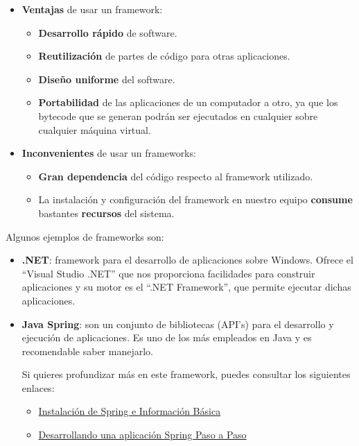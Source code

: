 \begin{itemize}
    \item \textbf{Ventajas} de usar un framework:
    \begin{itemize}
        \item \textbf{Desarrollo rápido} de software.
        \item \textbf{Reutilización} de partes de código para otras aplicaciones.
        \item \textbf{Diseño uniforme} del software.
        \item \textbf{Portabilidad} de las aplicaciones de un computador a otro, ya que los bytecode que se generan podrán ser ejecutados en cualquier sobre cualquier máquina virtual.
    \end{itemize}

    \item \textbf{Inconvenientes} de usar un frameworks:
    \begin{itemize}
        \item \textbf{Gran dependencia} del código respecto al framework utilizado.
        \item La instalación y configuración del framework en nuestro equipo \textbf{consume} bastantes \textbf{recursos} del sistema.
    \end{itemize}
\end{itemize}

Algunos ejemplos de frameworks son:

\begin{itemize}
    \item \textbf{.NET}: framework para el desarrollo de aplicaciones sobre Windows. Ofrece el ``Visual Studio .NET'' que nos proporciona facilidades para construir aplicaciones y su motor es el ``.NET Framework'', que permite ejecutar dichas aplicaciones.
    \item \textbf{Java Spring}: son un conjunto de bibliotecas (API's) para el desarrollo y ejecución de aplicaciones. Es uno de los más empleados en Java y es recomendable saber manejarlo.

    Si quieres profundizar más en este framework, puedes consultar los siguientes enlaces:
    \begin{itemize}
        \item \href{https://educacionadistancia.juntadeandalucia.es/formacionprofesional/pluginfile.php/35569/mod/_scorm/content/16/spring_tutorial_v0.271.pdf}{Instalación de Spring e Información Básica}
        \item \href{https://www.uv.es/grimo/teaching/SpringMVCv4PasoAPaso/index.html}{Desarrollando una aplicación Spring Paso a Paso}
    \end{itemize}
\end{itemize}

